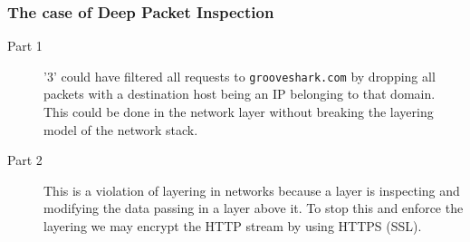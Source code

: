 \documentclass[a4paper]{article}
\begin{document}
\subsubsection{The case of Deep Packet Inspection}
\begin{description}
    \item[Part 1] '3' could have filtered all requests to \texttt{grooveshark.com} by dropping all packets
        with a destination host being an IP belonging to that domain. This could be done in the network layer without
        breaking the layering model of the network stack.
    \item[Part 2] This is a violation of layering in networks because a layer is inspecting and modifying
        the data passing in a layer above it. To stop this and enforce the layering we may encrypt the HTTP
        stream by using HTTPS (SSL).
\end{description}
\end{document}

